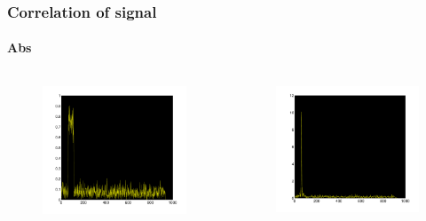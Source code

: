 \documentclass[11pt]{beamer} %
\begin{document}
\begin{frame}
 \frametitle{Correlation of signal}
\framesubtitle{Abs}
 \begin{columns}[T]
        \begin{column}{.5\textwidth}
           
          \begin{figure}
\includegraphics[width=1\textwidth]{Figures/SampledRx2DAbs.pdf}
\end{figure}
        \end{column}
         \begin{column}{.5\textwidth}

      \begin{figure}
\includegraphics[width=1\textwidth]{Figures/SampledCorrelatedRx2DAbs.pdf}
\end{figure}
        \end{column}
\end{columns}
\end{frame}
\end{document}
